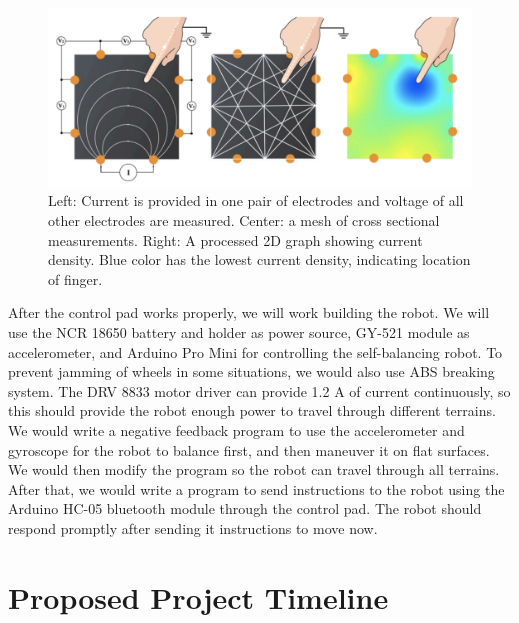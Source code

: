 \documentclass[a4paper,12pt]{article}
\begin{document}
\begin{figure}[!htb]
\begin{center}
\includegraphics[width=6in]{graph.png}
\caption{Left: Current is provided in one pair of electrodes and voltage of all other electrodes are measured. Center: a mesh of cross sectional measurements. Right: A processed 2D graph showing current density. Blue color has the lowest current density, indicating location of finger. \cite{Zhang2017}}
\end{center}
\end{figure}

After the control pad works properly, we will work building the robot. We will use the NCR 18650 battery and holder as power source, GY-521 module as accelerometer, and Arduino Pro Mini for controlling the self-balancing robot. To prevent jamming of wheels in some situations, we would also use ABS breaking system. The DRV 8833 motor driver can provide 1.2 A of current continuously, so this should provide the robot enough power to travel through different terrains. We would write a negative feedback program to use the accelerometer and gyroscope for the robot to balance first, and then maneuver it on flat surfaces. We would then modify the program so the robot can travel through all terrains. After that, we would write a program to send instructions to the robot using the Arduino HC-05 bluetooth module through the control pad. The robot should respond promptly after sending it instructions to move now.


\section{Proposed Project Timeline}
\end{document}
